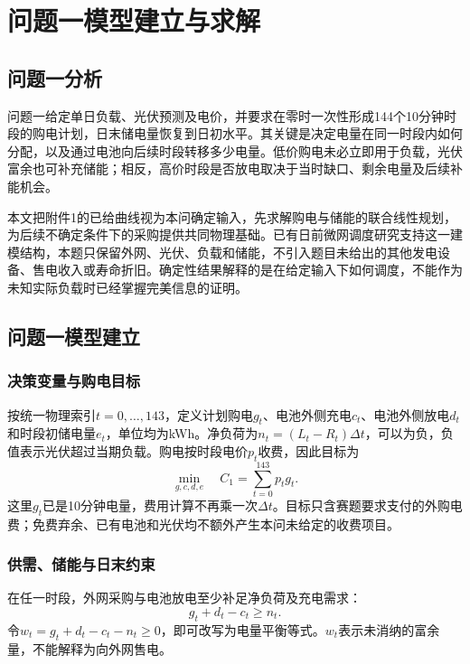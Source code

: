 \section{问题一模型建立与求解}

\subsection{问题一分析}

问题一给定单日负载、光伏预测及电价，并要求在零时一次性形成144个10分钟时段的购电计划，日末储电量恢复到日初水平。其关键是决定电量在同一时段内如何分配，以及通过电池向后续时段转移多少电量。低价购电未必立即用于负载，光伏富余也可补充储能；相反，高价时段是否放电取决于当时缺口、剩余电量及后续补能机会。

本文把附件1的已给曲线视为本问确定输入，先求解购电与储能的联合线性规划，为后续不确定条件下的采购提供共同物理基础。已有日前微网调度研究\cite{kong2016,silva2020}支持这一建模结构，本题只保留外网、光伏、负载和储能，不引入题目未给出的其他发电设备、售电收入或寿命折旧。确定性结果解释的是在给定输入下如何调度，不能作为未知实际负载时已经掌握完美信息的证明。

\subsection{问题一模型建立}

\subsubsection{决策变量与购电目标}

按统一物理索引$t=0,\ldots,143$，定义计划购电$g_t$、电池外侧充电$c_t$、电池外侧放电$d_t$和时段初储电量$e_t$，单位均为kWh。净负荷为$n_t=(L_t-R_t)\Delta t$，可以为负，负值表示光伏超过当期负载。购电按时段电价$p_t$收费，因此目标为
\begin{equation}
 \min_{g,c,d,e}\quad C_1=\sum_{t=0}^{143}p_tg_t.
 \label{eq:q1_objective}
\end{equation}
这里$g_t$已是10分钟电量，费用计算不再乘一次$\Delta t$。目标只含赛题要求支付的外购电费；免费弃余、已有电池和光伏均不额外产生本问未给定的收费项目。

\subsubsection{供需、储能与日末约束}

在任一时段，外网采购与电池放电至少补足净负荷及充电需求：
\begin{equation}
 g_t+d_t-c_t\ge n_t.
 \label{eq:balance}
\end{equation}
令$w_t=g_t+d_t-c_t-n_t\ge0$，即可改写为电量平衡等式。$w_t$表示未消纳的富余量，不能解释为向外网售电。

